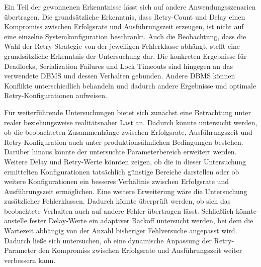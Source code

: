
Ein Teil der gewonnenen Erkenntnisse lässt sich auf andere Anwendungsszenarien übertragen.
Die grundsätzliche Erkenntnis, dass Retry-Count und Delay einen Kompromiss zwischen Erfolgsrate und Ausführungszeit
erzeugen, ist nicht auf eine einzelne Systemkonfiguration beschränkt.
Auch die Beobachtung, dass die Wahl der Retry-Strategie von der jeweiligen Fehlerklasse abhängt, stellt eine
grundsätzliche Erkenntnis der Untersuchung dar.
Die konkreten Ergebnisse für Deadlocks, Serialization Failures und Lock Timeouts sind hingegen an das verwendete DBMS
und dessen Verhalten gebunden.
Andere DBMS können Konflikte unterschiedlich behandeln und dadurch andere Ergebnisse und optimale Retry-Konfigurationen
aufweisen.

Für weiterführende Untersuchungen bietet sich zunächst eine Betrachtung unter realer beziehungsweise realitätsnaher
Last an.
Dadurch könnte untersucht werden, ob die beobachteten Zusammenhänge zwischen Erfolgsrate, Ausführungszeit und
Retry-Konfiguration auch unter produktionsähnlichen Bedingungen bestehen.
Darüber hinaus könnte der untersuchte Parameterbereich erweitert werden.
Weitere Delay und Retry-Werte könnten zeigen, ob die in dieser Untersuchung ermittelten Konfigurationen tatsächlich
günstige Bereiche darstellen oder ob weitere Konfigurationen ein besseres Verhältnis zwischen Erfolgsrate und
Ausführungszeit ermöglichen.
Eine weitere Erweiterung wäre die Untersuchung zusätzlicher Fehlerklassen.
Dadurch könnte überprüft werden, ob sich das beobachtete Verhalten auch auf andere Fehler übertragen lässt.
Schließlich könnte anstelle fester Delay-Werte ein adaptiver Backoff untersucht werden, bei dem die Wartezeit
abhängig von der Anzahl bisheriger Fehlversuche angepasst wird.
Dadurch ließe sich untersuchen, ob eine dynamische Anpassung der Retry-Parameter den Kompromiss zwischen Erfolgsrate
und Ausführungszeit weiter verbessern kann.